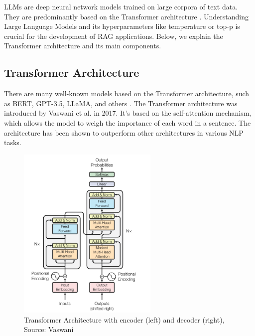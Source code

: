 

LLMs are deep neural network models trained on large corpora of text data. They are predominantly based on the Transformer architecture \cite{Wolf.09.10.2019}. Understanding Large Language Models and its hyperparameters like temperature or top-p is crucial for the development of RAG applications. Below, we explain the Transformer architecture and its main components.

\subsection{Transformer Architecture}
There are many well-known models based on the Transformer architecture, such as BERT, GPT-3.5, LLaMA, and others \cite{Yin.2024}. The Transformer architecture was introduced by Vaswani et al. in 2017. It's based on the self-attention mechanism, which allows the model to weigh the importance of each word in a sentence. The architecture has been shown to outperform other architectures in various NLP tasks.

\begin{figure}[!ht]
    \centering
    \includegraphics[width=0.6\textwidth]{images/transformers_architecture.png}
    \caption{Transformer Architecture with encoder (left) and decoder (right), Source: Vaswani \cite{vaswani2023attentionneed}}
    \label{fig:transformer_architecture}
\end{figure}

